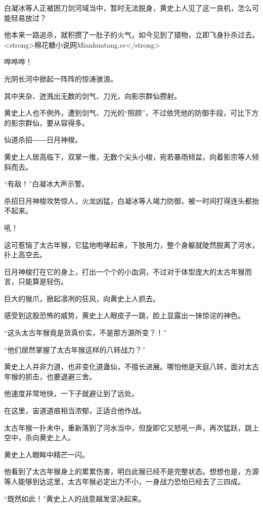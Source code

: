 
\begin{this_body}

白凝冰等人正被困刀剑河域当中，暂时无法脱身，黄史上人见了这一良机，怎么可能轻易放过？

他本来一路追杀，就积攒了一肚子的火气，如今见到了猎物，立即飞身扑杀过去。<strong>棉花糖小说网Mianhuatang.cc</strong>

哗哗哗！

光阴长河中掀起一阵阵的惊涛骇浪。

其中夹杂、迸溅出无数的剑气、刀光，向影宗群仙攒射。

黄史上人也不例外，遭到剑气、刀光的“照顾”，不过依凭他的防御手段，可比下方的影宗群仙，要从容得多。

仙道杀招――日月神梭。

黄史上人居高临下，双掌一推，无数个尖头小梭，宛若暴雨倾盆，向着影宗等人倾斜而去。

“有敌！”白凝冰大声示警。

杀招日月神梭攻势惊人，火龙凶猛，白凝冰等人竭力防御，被一时间打得连头都抬不起来。

吼！

这可惹恼了太古年猴，它猛地咆哮起来，下肢用力，整个身躯就陡然脱离了河水，扑上高空去。

日月神梭打在它的身上，打出一个个的小血洞，不过对于体型庞大的太古年猴而言，只能算是轻伤。

巨大的猴爪，掀起凛冽的狂风，向黄史上人抓去。

感受到这股恐怖的威势，黄史上人眼皮子一跳，脸上显露出一抹惊诧的神色。

“这头太古年猴竟是货真价实，不是那方源所变？！”

“他们居然掌握了太古年猴这样的八转战力？”

黄史上人并非力道，也非变化道蛊仙，不擅长进展。哪怕他是天庭八转，面对太古年猴的抓击，也要退避三舍。

他速度非常地快，一下子就避让到了远处。

在这里，宙道道痕相当浓郁，正适合他作战。

太古年猴一扑未中，重新落到了河水当中，但旋即它又怒吼一声，再次猛跃，跳上空中，杀向黄史上人。

黄史上人眼眸中精芒一闪。

他看到了太古年猴身上的累累伤害，明白此猴已经不是完整状态。想想也是，方源等人能够到达这里，太古年猴必定出力不小，一身战力恐怕已经去了三四成。

“既然如此！”黄史上人的战意越发坚决起来。


\end{this_body}
